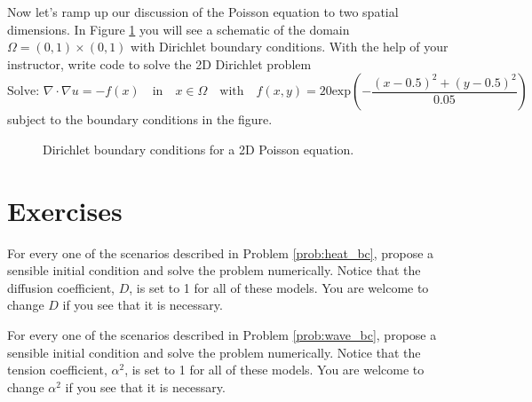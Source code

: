 \begin{problem}
    Now let's ramp up our discussion of the Poisson equation to two spatial dimensions.
    In Figure \ref{fig:2DPoisson_BC} you will see a schematic of the domain
    $\Omega=(0,1)\times (0,1)$ with Dirichlet boundary conditions.  With the help of your
    instructor, write code to solve the 2D Dirichlet problem
    \[ \text{Solve: } \nabla \cdot \nabla u = - f(x) \quad \text{in} \quad x \in \Omega \quad \text{with} \quad
    f(x,y) = 20\text{exp}\left( -\frac{(x-0.5)^2 + (y-0.5)^2}{0.05} \right) \]
    subject to the boundary conditions in the figure.

    \begin{figure}[ht!]
        \centering
        \caption{Dirichlet boundary conditions for a 2D Poisson equation.}
        \label{fig:2DPoisson_BC}
    \end{figure}
\end{problem}






\newpage\section{Exercises}

\begin{problem}
    For every one of the scenarios described in Problem \ref{prob:heat_bc}, propose a
    sensible initial condition and solve the problem numerically.  Notice that the
    diffusion coefficient, $D$, is set to 1 for all of these models.  You are welcome to
    change $D$ if you see that it is necessary.
\end{problem}

\begin{problem}
    For every one of the scenarios described in Problem \ref{prob:wave_bc}, propose a
    sensible initial condition and solve the problem numerically.  Notice that the
    tension coefficient, $\alpha^2$, is set to 1 for all of these models.  You are welcome to
    change $\alpha^2$ if you see that it is necessary.
\end{problem}

